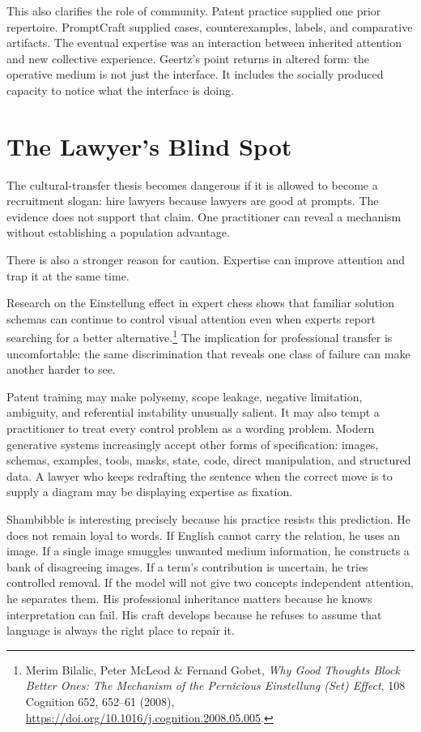 \documentclass[11pt]{article}
\begin{document}
This also clarifies the role of community. Patent practice supplied one prior repertoire. PromptCraft supplied cases, counterexamples, labels, and comparative artifacts. The eventual expertise was an interaction between inherited attention and new collective experience. Geertz's point returns in altered form: the operative medium is not just the interface. It includes the socially produced capacity to notice what the interface is doing.

\section{The Lawyer's Blind Spot}

The cultural-transfer thesis becomes dangerous if it is allowed to become a recruitment slogan: hire lawyers because lawyers are good at prompts. The evidence does not support that claim. One practitioner can reveal a mechanism without establishing a population advantage.

There is also a stronger reason for caution. Expertise can improve attention and trap it at the same time.

Research on the Einstellung effect in expert chess shows that familiar solution schemas can continue to control visual attention even when experts report searching for a better alternative.\footnote{Merim Bilalic, Peter McLeod \& Fernand Gobet, \textit{Why Good Thoughts Block Better Ones: The Mechanism of the Pernicious Einstellung (Set) Effect}, 108 Cognition 652, 652--61 (2008), \url{https://doi.org/10.1016/j.cognition.2008.05.005}.} The implication for professional transfer is uncomfortable: the same discrimination that reveals one class of failure can make another harder to see.

Patent training may make polysemy, scope leakage, negative limitation, ambiguity, and referential instability unusually salient. It may also tempt a practitioner to treat every control problem as a wording problem. Modern generative systems increasingly accept other forms of specification: images, schemas, examples, tools, masks, state, code, direct manipulation, and structured data. A lawyer who keeps redrafting the sentence when the correct move is to supply a diagram may be displaying expertise as fixation.

Shambibble is interesting precisely because his practice resists this prediction. He does not remain loyal to words. If English cannot carry the relation, he uses an image. If a single image smuggles unwanted medium information, he constructs a bank of disagreeing images. If a term's contribution is uncertain, he tries controlled removal. If the model will not give two concepts independent attention, he separates them. His professional inheritance matters because he knows interpretation can fail. His craft develops because he refuses to assume that language is always the right place to repair it.
\end{document}
